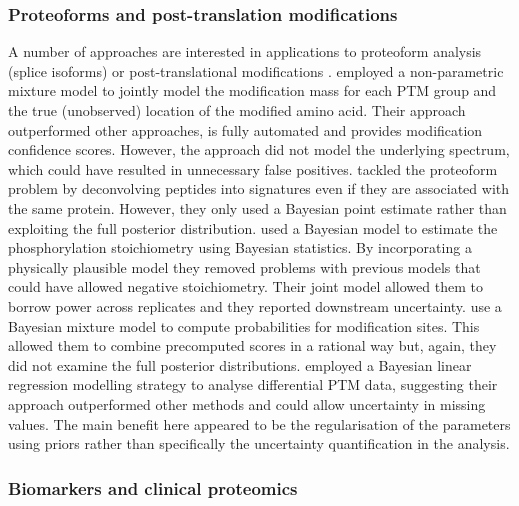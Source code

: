 \documentclass[12pt,english, journal=jpr, layout=twocolumn]{article}
\begin{document}
\subsubsection{Proteoforms and post-translation modifications}
A number of approaches are interested in applications to proteoform analysis (splice isoforms) or post-translational modifications \citep{Chung::2013, Webb::2014, Lim::2017, Shteynberg::2019, Mallikarun::2020}. \citet{Chung::2013} employed a non-parametric mixture model to jointly model the modification mass for each PTM group and the true (unobserved) location of the modified amino acid. Their approach outperformed other approaches, is fully automated and provides modification confidence scores. However, the approach did not model the underlying spectrum, which could have resulted in unnecessary false positives. \citet{Webb::2014} tackled the proteoform problem by deconvolving peptides into signatures even if they are associated with the same protein. However, they only used a Bayesian point estimate rather than exploiting the full posterior distribution. \citet{Lim::2017} used a Bayesian model to estimate the phosphorylation stoichiometry using Bayesian statistics. By incorporating a physically plausible model they removed problems with previous models that could have allowed negative stoichiometry. Their joint model allowed them to borrow power across replicates and they reported downstream uncertainty. \citet{Shteynberg::2019} use a Bayesian mixture model to compute probabilities for modification sites. This allowed them to combine precomputed scores in a rational way but, again, they did not examine the full posterior distributions. \citet{Mallikarun::2020} employed a Bayesian linear regression modelling strategy to analyse differential PTM data, suggesting their approach outperformed other methods and could allow uncertainty in missing values. The main benefit here appeared to be the regularisation of the parameters using priors rather than specifically the uncertainty quantification in the analysis.

\subsubsection{Biomarkers and clinical proteomics}
\end{document}
